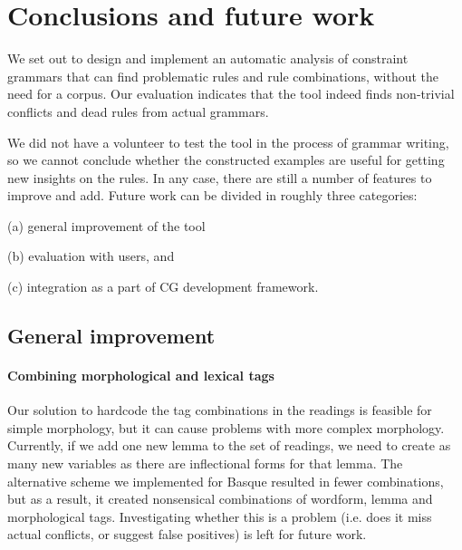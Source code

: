 {{

\section{Conclusions and future work}

We set out to design and implement an automatic analysis of constraint grammars that can find problematic rules and rule combinations, without the need for a corpus.
Our evaluation indicates that the tool indeed finds non-trivial conflicts and dead rules
from actual grammars. 

We did not have a volunteer to test the tool in
the process of grammar writing, so we cannot conclude whether the
constructed examples are useful for getting new insights on the rules.
In any case, there are still a number of features to improve and add.
Future work can be divided in roughly three categories: 
\begin{inparaenum}
\item[(a)] general improvement of the tool
\item[(b)] evaluation with users, and 
\item[(c)] integration as a part of CG development framework.
\end{inparaenum}

\subsection{General improvement}

\paragraph{Combining morphological and lexical tags}

Our solution to hardcode the tag combinations in the readings is
feasible for simple morphology, but it can cause problems with more
complex morphology. Currently, if we add one new lemma to the set of
readings, we need to create as many new variables as there are
inflectional forms for that lemma.  The alternative scheme we
implemented for Basque resulted in fewer combinations, but as a
result, it created nonsensical combinations of wordform, lemma and
morphological tags. Investigating whether this is a problem (i.e. does
it miss actual conflicts, or suggest false positives) is left for
future work.


}}
